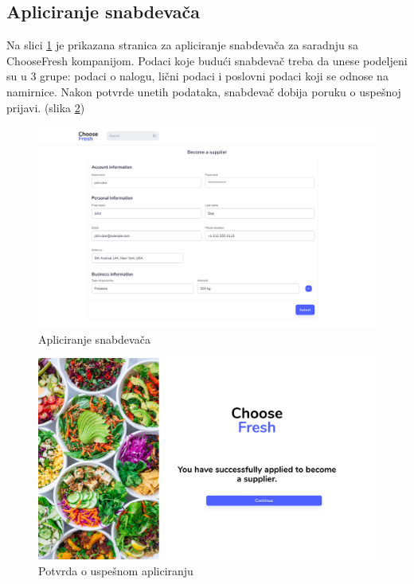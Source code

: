 \subsection{Apliciranje snabdevača}

Na slici \ref{fig:SupplierApplicationScreen1} je prikazana stranica za apliciranje snabdevača za saradnju sa ChooseFresh kompanijom. Podaci koje budući snabdevač treba da unese podeljeni su u 3 grupe: podaci o nalogu, lični podaci i poslovni podaci koji se odnose na namirnice.
Nakon potvrde unetih podataka, snabdevač dobija poruku o uspešnoj prijavi. (slika \ref{fig:SupplierApplicationScreen2})

\begin{figure}[H]
    \begin{center}
        \includegraphics[width=\textwidth]{UI/Supplier Application (Screen 1).png}
            \caption{Apliciranje snabdevača}
    \label{fig:SupplierApplicationScreen1}
    \end{center}
\end{figure}

\begin{figure}[H]
    \begin{center}
        \includegraphics[width=\textwidth]{UI/Supplier Application (Screen 2).png}
            \caption{Potvrda o uspešnom apliciranju}
    \label{fig:SupplierApplicationScreen2}
    \end{center}
\end{figure}

